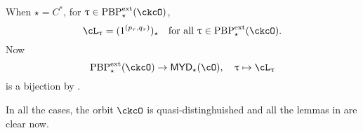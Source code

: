 \documentclass[12pt,a4paper]{amsart}
\def\MYD{{\mathsf{MYD}}}
\numberwithin{equation}{section}
\newtheorem{lem}[thm]{Lemma}
\theoremstyle{remark}
\def\dpeNil{\Nil^{\mathrm{dpe}}}
\def\ssign{\mathrm{Sign}}
\def\Thetab{\bar{\Theta}}
\def\drc{\mathrm{DRC}}
\def\LLS{\mathrm{{}^{\ell} LS}}
\def\PBPes{\mathrm{PBP}^{\mathrm{ext}}_{\star}}
\def\uptaup{\uptau^{\prime}}
\begin{document}
When $\star = C^{*}$, for $\uptau\in \PBPes(\ckcO)$,
\[
  \ac_{\uptau} = (1^{(p_{\tau},q_{\tau})})_{\star}\quad \Forall \uptau\in \PBPes(\ckcO).
\]
Now
\[
    \PBPes(\ckcO) \rightarrow  \MYD_{\star}(\cO), \quad
    \uptau \mapsto \ac_{\uptau}
\]
is a bijection by .

In all the cases, the orbit $\ckcO$ is quasi-distinghuished and all the lemmas
in  are clear now.





\end{document}
